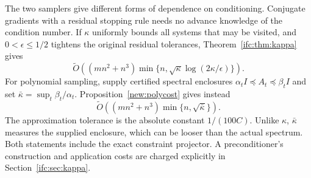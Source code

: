 \documentclass[11pt]{amsart}
\theoremstyle{definition}\newtheorem{definition}[theorem]{Definition}
\theoremstyle{remark}\newtheorem{remark}[theorem]{Remark}
\numberwithin{equation}{section}
\begin{document}
The two samplers give different forms of dependence on conditioning.
Conjugate gradients with a residual stopping rule needs no advance
knowledge of the condition number. If $\kappa$ uniformly bounds all systems that may be
visited, and $0<\epsilon\le1/2$ tightens the original residual tolerances,
Theorem~\ref{ifc:thm:kappa} gives
\begin{equation}\label{i:cg}
 \widetilde O\!\left((mn^2+n^3)
 \min\{n,\sqrt\kappa\log(2\kappa/\epsilon)\}\right).
\end{equation}
For polynomial sampling, supply certified spectral enclosures
$\alpha_t I\preceq A_t\preceq\beta_t I$ and set
$\bar\kappa=\sup_t\beta_t/\alpha_t$. Proposition~\ref{new:polycost}
gives instead
\begin{equation}\label{i:poly}
 \widetilde O\!\left((mn^2+n^3)\min\{n,\sqrt{\bar\kappa}\}\right).
\end{equation}
The approximation tolerance is the absolute constant $1/(100C)$.
Unlike $\kappa$, $\bar\kappa$ measures the supplied enclosure, which can
be looser than the actual spectrum. Both statements include the exact
constraint projector. A preconditioner's construction and application
costs are charged explicitly in Section~\ref{ifc:sec:kappa}.
\end{document}
